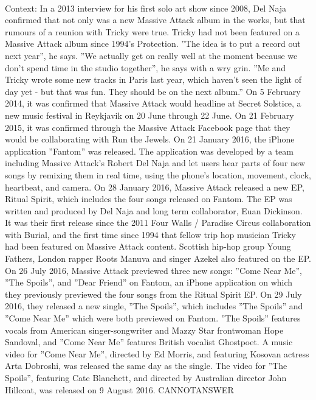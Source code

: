 \documentclass[11pt,a4paper, onecolumn]{article}
\begin{document}
\\ Context: In a 2013 interview for his first solo art show since 2008, Del Naja confirmed that not only was a new Massive Attack album in the works, but that rumours of a reunion with Tricky were true. Tricky had not been featured on a Massive Attack album since 1994's Protection. ''The idea is to put a record out next year'', he says. ''We actually get on really well at the moment because we don't spend time in the studio together'', he says with a wry grin. ''Me and Tricky wrote some new tracks in Paris last year, which haven't seen the light of day yet - but that was fun. They should be on the next album.'' On 5 February 2014, it was confirmed that Massive Attack would headline at Secret Solstice, a new music festival in Reykjavik on 20 June through 22 June. On 21 February 2015, it was confirmed through the Massive Attack Facebook page that they would be collaborating with Run the Jewels. On 21 January 2016, the iPhone application ''Fantom'' was released. The application was developed by a team including Massive Attack's Robert Del Naja and let users hear parts of four new songs by remixing them in real time, using the phone's location, movement, clock, heartbeat, and camera. On 28 January 2016, Massive Attack released a new EP, Ritual Spirit, which includes the four songs released on Fantom. The EP was written and produced by Del Naja and long term collaborator, Euan Dickinson. It was their first release since the 2011 Four Walls / Paradise Circus collaboration with Burial, and the first time since 1994 that fellow trip hop musician Tricky had been featured on Massive Attack content. Scottish hip-hop group Young Fathers, London rapper Roots Manuva and singer Azekel also featured on the EP. On 26 July 2016, Massive Attack previewed three new songs: ''Come Near Me'', ''The Spoils'', and ''Dear Friend'' on Fantom, an iPhone application on which they previously previewed the four songs from the Ritual Spirit EP. On 29 July 2016, they released a new single, ''The Spoils'', which includes ''The Spoils'' and ''Come Near Me'' which were both previewed on Fantom. ''The Spoils'' features vocals from American singer-songwriter and Mazzy Star frontwoman Hope Sandoval, and ''Come Near Me'' features British vocalist Ghostpoet. A music video for ''Come Near Me'', directed by Ed Morris, and featuring Kosovan actress Arta Dobroshi, was released the same day as the single. The video for ''The Spoils'', featuring Cate Blanchett, and directed by Australian director John Hillcoat, was released on 9 August 2016. CANNOTANSWER
\end{document}
